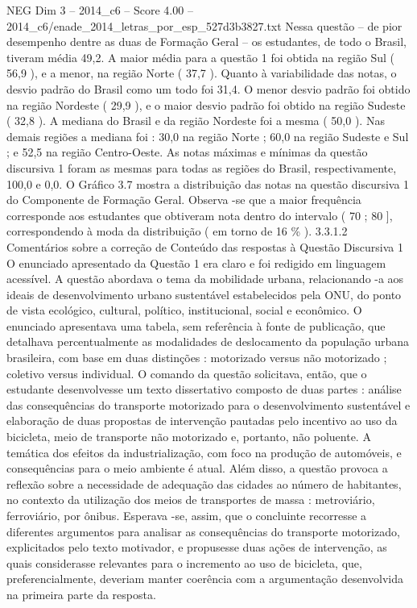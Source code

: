 \begin{textsample}{NEG Dim 3 – 2014\_c6 – Score 4.00 – 2014\_c6/enade\_2014\_letras\_por\_esp\_527d3b3827.txt}
Nessa questão – de pior desempenho dentre as duas de Formação Geral – os estudantes, de todo o Brasil, tiveram média 49,2.
A maior média para a questão 1 foi obtida na região Sul ( 56,9 ), e a menor, na região Norte ( 37,7 ).
Quanto à variabilidade das notas, o desvio padrão do Brasil como um todo foi 31,4.
O menor desvio padrão foi obtido na região Nordeste ( 29,9 ), e o maior desvio padrão foi obtido na região Sudeste ( 32,8 ).
A mediana do Brasil e da região Nordeste foi a mesma ( 50,0 ).
Nas demais regiões a mediana foi : 30,0 na região Norte ; 60,0 na região Sudeste e Sul ; e 52,5 na região Centro-Oeste.
As notas máximas e mínimas da questão discursiva 1 foram as mesmas para todas as regiões do Brasil, respectivamente, 100,0 e 0,0.
O Gráfico 3.7 mostra a distribuição das notas na questão discursiva 1 do Componente de Formação Geral.
Observa -se que a maior frequência corresponde aos estudantes que obtiveram nota dentro do intervalo ( 70 ; 80 ], correspondendo à moda da distribuição ( em torno de 16 \% ). 3.3.1.2 Comentários sobre a correção de Conteúdo das respostas à Questão Discursiva 1 O enunciado apresentado da Questão 1 era claro e foi redigido em linguagem acessível.
A questão abordava o tema da mobilidade urbana, relacionando -a aos ideais de desenvolvimento urbano sustentável estabelecidos pela ONU, do ponto de vista ecológico, cultural, político, institucional, social e econômico.
O enunciado apresentava uma tabela, sem referência à fonte de publicação, que detalhava percentualmente as modalidades de deslocamento da população urbana brasileira, com base em duas distinções : motorizado versus não motorizado ; coletivo versus individual.
O comando da questão solicitava, então, que o estudante desenvolvesse um texto dissertativo composto de duas partes : análise das consequências do transporte motorizado para o desenvolvimento sustentável e elaboração de duas propostas de intervenção pautadas pelo incentivo ao uso da bicicleta, meio de transporte não motorizado e, portanto, não poluente.
A temática dos efeitos da industrialização, com foco na produção de automóveis, e consequências para o meio ambiente é atual.
Além disso, a questão provoca a reflexão sobre a necessidade de adequação das cidades ao número de habitantes, no contexto da utilização dos meios de transportes de massa : metroviário, ferroviário, por ônibus.
Esperava -se, assim, que o concluinte recorresse a diferentes argumentos para analisar as consequências do transporte motorizado, explicitados pelo texto motivador, e propusesse duas ações de intervenção, as quais considerasse relevantes para o incremento ao uso de bicicleta, que, preferencialmente, deveriam manter coerência com a argumentação desenvolvida na primeira parte da resposta.

\end{textsample}
